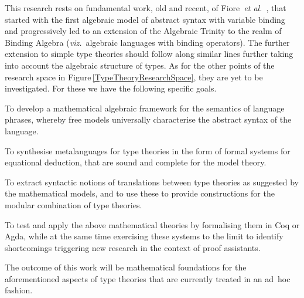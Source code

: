 \documentclass[11pt,twocolumn]{article}
\newcounter{CC}
\newenvironment{resenumerate}
  {\begin{list}{[\textbf{\arabic{CC}]}}
  {\usecounter{CC}
   \setlength{\topsep}{2pt}
   \setlength{\partopsep}{2pt}
   \setlength{\itemsep}{2.5pt}
   \setlength{\parsep}{2.5pt}
   \setlength{\leftmargin}{1.65em}
   \setlength{\labelwidth}{1.15em}
 }}
  {\end{list}}
\newcommand{\hide}[1]{}
\newcommand{\viz}{\emph{viz.}}
\newcommand{\etal}{\emph{et al.}}
\begin{document}
This research rests on fundamental work, old and recent, of
Fiore~\etal~\cite{FiorePlotkinTuri,FioreLICS08,FioreHurLMCS,FioreSecOrdEqLog,FioreMahmoud},
that started with the first algebraic model of abstract syntax with variable
binding and progressively led to an extension of the
Algebraic Trinity to the realm of Binding Algebra (\viz~algebraic languages
with binding operators).  The further extension to simple type theories should
follow along similar lines further taking into account the algebraic structure
of types.  As for the other points of the research space in
Figure\,\ref{TypeTheoryResearchSpace}, they are yet to be investigated.  For
these we have the following specific goals.
\begin{resenumerate}\setcounter{CC}{0}
\item
  To develop a mathematical algebraic framework for the semantics of
  language phrases, whereby free models universally characterise the
  abstract syntax of the language.

\item
  To synthesise metalanguages for type theories in the form of formal
  systems for equational deduction, that are sound and complete for the
  model theory.

\item
  To extract syntactic notions of translations between type theories as
  suggested by the mathematical models, and to use these to provide
  constructions for the modular combination of type theories.

\item
  To test and apply the above mathematical theories by formalising them in
  Coq or Agda, while at the same time exercising these systems to the
  limit to identify shortcomings triggering new research in the context of
  proof assistants.
\end{resenumerate}
The outcome of this work will be mathematical foundations for the
aforementioned aspects of type theories that are currently treated in an
ad~hoc fashion.  
\hide{
Furthermore, it will provide a principled approach by which
to reconsider the problem of integrating polymorphism and dependent types. 
}

\hide{ polynomial functors (from discrete to groupoidal) --- the meaning of
  typing rules}
\end{document}
